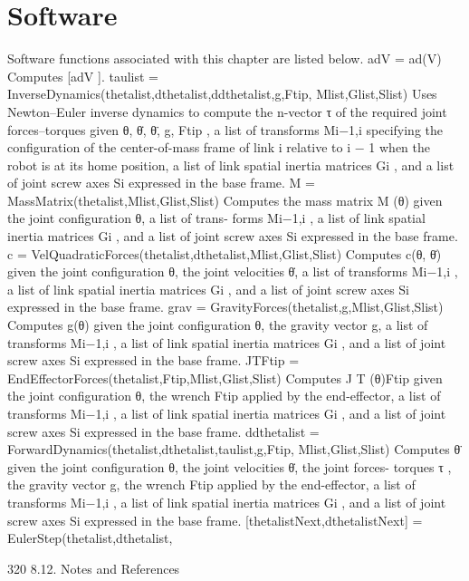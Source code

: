 \documentclass[12pt,a4paper]{article}
\begin{document}
\section{Software}
Software functions associated with this chapter are listed below.
adV = ad(V)
Computes [adV ].
taulist = InverseDynamics(thetalist,dthetalist,ddthetalist,g,Ftip,
Mlist,Glist,Slist)
Uses Newton–Euler inverse dynamics to compute the n-vector τ of the required
joint forces–torques given θ, θ̇, θ̈, g, Ftip , a list of transforms Mi−1,i specifying
the configuration of the center-of-mass frame of link {i} relative to {i − 1} when
the robot is at its home position, a list of link spatial inertia matrices Gi , and a
list of joint screw axes Si expressed in the base frame.
M = MassMatrix(thetalist,Mlist,Glist,Slist)
Computes the mass matrix M (θ) given the joint configuration θ, a list of trans-
forms Mi−1,i , a list of link spatial inertia matrices Gi , and a list of joint screw
axes Si expressed in the base frame.
c = VelQuadraticForces(thetalist,dthetalist,Mlist,Glist,Slist)
Computes c(θ, θ̇) given the joint configuration θ, the joint velocities θ̇, a list of
transforms Mi−1,i , a list of link spatial inertia matrices Gi , and a list of joint
screw axes Si expressed in the base frame.
grav = GravityForces(thetalist,g,Mlist,Glist,Slist)
Computes g(θ) given the joint configuration θ, the gravity vector g, a list of
transforms Mi−1,i , a list of link spatial inertia matrices Gi , and a list of joint
screw axes Si expressed in the base frame.
JTFtip = EndEffectorForces(thetalist,Ftip,Mlist,Glist,Slist)
Computes J T (θ)Ftip given the joint configuration θ, the wrench Ftip applied by
the end-effector, a list of transforms Mi−1,i , a list of link spatial inertia matrices
Gi , and a list of joint screw axes Si expressed in the base frame.
ddthetalist = ForwardDynamics(thetalist,dthetalist,taulist,g,Ftip,
Mlist,Glist,Slist)
Computes θ̈ given the joint configuration θ, the joint velocities θ̇, the joint forces-
torques τ , the gravity vector g, the wrench Ftip applied by the end-effector, a
list of transforms Mi−1,i , a list of link spatial inertia matrices Gi , and a list of
joint screw axes Si expressed in the base frame.
[thetalistNext,dthetalistNext] = EulerStep(thetalist,dthetalist,


320                                                                   8.12. Notes and References
\end{document}
